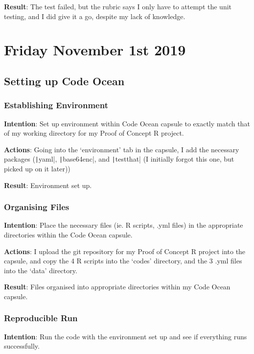 \documentclass{article}
\begin{document}
\textbf{Result}: The test failed, but the rubric says I only have to attempt the unit testing, and I did give it a go, despite my lack of knowledge.

\section{Friday November 1st 2019}

\subsection{Setting up Code Ocean}

\subsubsection{Establishing Environment}

\textbf{Intention}: Set up environment within Code Ocean capsule to exactly match that of my working directory for my Proof of Concept R project.

\textbf{Actions}: Going into the `environment' tab in the capsule, I add the necessary packages (\texttt|yaml|, \texttt|base64enc|, and \texttt|testthat| (I initially forgot this one, but picked up on it later))

\textbf{Result}: Environment set up.

\subsubsection{Organising Files}

\textbf{Intention}: Place the necessary files (ie. R scripts, .yml files) in the appropriate directories within the Code Ocean capsule.

\textbf{Actions}: I upload the git repository for my Proof of Concept R project into the capsule, and copy the 4 R scripts into the `codes' directory, and the 3 .yml files into the `data' directory.

\textbf{Result}: Files organised into appropriate directories within my Code Ocean capsule.

\subsubsection{Reproducible Run}

\textbf{Intention}: Run the code with the environment set up and see if everything runs successfully.
\end{document}
